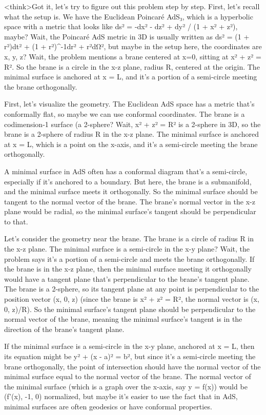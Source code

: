 <think>Got it, let's try to figure out this problem step by step. First, let's recall what the setup is. We have the Euclidean Poincaré AdS₃, which is a hyperbolic space with a metric that looks like ds² = -dx² - dz² + dy² / (1 + x² + z²), maybe? Wait, the Poincaré AdS metric in 3D is usually written as ds² = (1 + r²)dt² + (1 + r²)^{-1}dr² + r²dΩ², but maybe in the setup here, the coordinates are x, y, z? Wait, the problem mentions a brane centered at x=0, sitting at x² + z² = R². So the brane is a circle in the x-z plane, radius R, centered at the origin. The minimal surface is anchored at x = L, and it's a portion of a semi-circle meeting the brane orthogonally. 

First, let's visualize the geometry. The Euclidean AdS space has a metric that's conformally flat, so maybe we can use conformal coordinates. The brane is a codimension-1 surface (a 2-sphere? Wait, x² + z² = R² is a 2-sphere in 3D, so the brane is a 2-sphere of radius R in the x-z plane. The minimal surface is anchored at x = L, which is a point on the x-axis, and it's a semi-circle meeting the brane orthogonally. 

A minimal surface in AdS often has a conformal diagram that's a semi-circle, especially if it's anchored to a boundary. But here, the brane is a submanifold, and the minimal surface meets it orthogonally. So the minimal surface should be tangent to the normal vector of the brane. The brane's normal vector in the x-z plane would be radial, so the minimal surface's tangent should be perpendicular to that. 

Let's consider the geometry near the brane. The brane is a circle of radius R in the x-z plane. The minimal surface is a semi-circle in the x-y plane? Wait, the problem says it's a portion of a semi-circle and meets the brane orthogonally. If the brane is in the x-z plane, then the minimal surface meeting it orthogonally would have a tangent plane that's perpendicular to the brane's tangent plane. The brane is a 2-sphere, so its tangent plane at any point is perpendicular to the position vector (x, 0, z) (since the brane is x² + z² = R², the normal vector is (x, 0, z)/R). So the minimal surface's tangent plane should be perpendicular to the normal vector of the brane, meaning the minimal surface's tangent is in the direction of the brane's tangent plane. 

If the minimal surface is a semi-circle in the x-y plane, anchored at x = L, then its equation might be y² + (x - a)² = b², but since it's a semi-circle meeting the brane orthogonally, the point of intersection should have the normal vector of the minimal surface equal to the normal vector of the brane. The normal vector of the minimal surface (which is a graph over the x-axis, say y = f(x)) would be (f'(x), -1, 0) normalized, but maybe it's easier to use the fact that in AdS, minimal surfaces are often geodesics or have conformal properties. 

